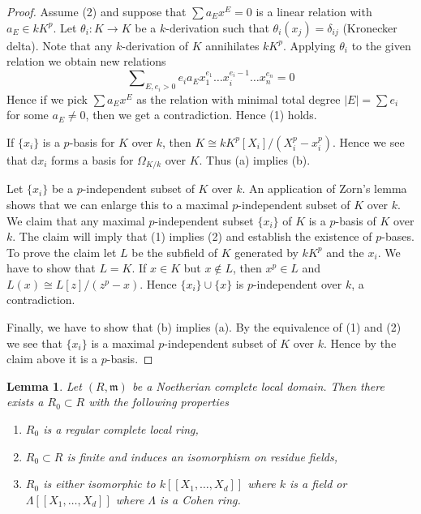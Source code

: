 \documentclass{amsart}
\theoremstyle{plain}
\newtheorem{lemma}[subsection]{Lemma}
\theoremstyle{definition}
\theoremstyle{remark}
\numberwithin{equation}{subsection}
\begin{document}
\begin{proof}
Assume (2) and suppose that $\sum a_E x^E = 0$ is a linear relation
with $a_E \in k K^p$. Let $\theta_i : K \to K$ be a $k$-derivation such that
$\theta_i(x_j) = \delta_{ij}$ (Kronecker delta). Note that any $k$-derivation
of $K$ annihilates $kK^p$. Applying $\theta_i$ to the given relation we
obtain new relations
$$
\sum\nolimits_{E, e_i > 0}
e_i a_E x_1^{e_1}\ldots x_i^{e_i - 1} \ldots x_n^{e_n} = 0
$$
Hence if we pick $\sum a_E x^E$ as the relation with minimal
total degree $|E| = \sum e_i$ for some $a_E \not = 0$, then we
get a contradiction. Hence (1) holds.

\medskip\noindent
If $\{x_i\}$ is a $p$-basis for $K$ over $k$, then
$K \cong kK^p[X_i]/(X_i^p - x_i^p)$. Hence we see that
$\text{d}x_i$ forms a basis for $\Omega_{K/k}$ over $K$.
Thus (a) implies (b).

\medskip\noindent
Let $\{x_i\}$ be a $p$-independent subset of $K$ over $k$. An application
of Zorn's lemma shows that we can enlarge this to a maximal $p$-independent
subset of $K$ over $k$. We claim that any maximal $p$-independent subset
$\{x_i\}$ of $K$ is a $p$-basis of $K$ over $k$. The claim will imply
that (1) implies (2) and establish the existence of $p$-bases.
To prove the claim let $L$ be the subfield of $K$ generated by
$kK^p$ and the $x_i$. We have to show that $L = K$. If $x \in K$
but $x \not \in L$, then $x^p \in L$ and $L(x) \cong L[z]/(z^p - x)$.
Hence $\{x_i\} \cup \{x\}$ is $p$-independent over $k$, a contradiction.

\medskip\noindent
Finally, we have to show that (b) implies (a). By the equivalence of (1)
and (2) we see that $\{x_i\}$ is a maximal $p$-independent subset
of $K$ over $k$. Hence by the claim above it is a $p$-basis.
\end{proof}


\begin{lemma}
\label{algebra-lemma-complete-local-Noetherian-domain-finite-over-regular}
Let $(R, \mathfrak m)$ be a Noetherian complete local domain.
Then there exists a $R_0 \subset R$ with the following properties
\begin{enumerate}
\item $R_0$ is a regular complete local ring,
\item $R_0 \subset R$ is finite and induces an isomorphism on
residue fields,
\item $R_0$ is either isomorphic to $k[[X_1, \ldots, X_d]]$ where $k$
is a field or $\Lambda[[X_1, \ldots, X_d]]$ where $\Lambda$ is a Cohen ring.
\end{enumerate}
\end{lemma}
\end{document}
